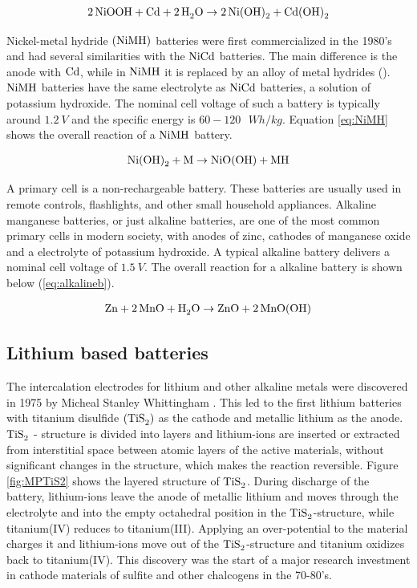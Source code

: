 \begin{align}\label{eq:NiCdb}
\ce{2NiOOH} + \ce{Cd} + \ce{2H_2O} \rightarrow \ce{2Ni(OH)_2} + \ce{Cd(OH)_2}
\end{align}

Nickel-metal hydride $(\ce{NiMH})$  batteries were first commercialized in the 1980's and had several similarities with the $\ce{NiCd}$ batteries. The main difference is the anode with $\ce{Cd}$, while in $\ce{NiMH}$ it is replaced by an alloy of metal hydrides (). $\ce{NiMH}$ batteries have the same electrolyte as $\ce{NiCd}$ batteries, a solution of potassium hydroxide. The nominal cell voltage of such a battery is typically around $\SI{1.2}{V}$ and the specific energy is $60-120\text{ } \si{Wh/kg}$. Equation \ref{eq:NiMH} shows the overall reaction of a $\ce{NiMH}$ battery.

\begin{align}\label{eq:NiMH}
\ce{Ni(OH)_2} + \ce{M} \rightarrow \ce{NiO(OH)} + \ce{MH}
\end{align}

A primary cell is a non-rechargeable battery. These batteries are usually used in remote controls, flashlights, and other small household appliances. Alkaline manganese batteries, or just alkaline batteries, are one of the most common primary cells in modern society, with anodes of zinc, cathodes of manganese oxide and a electrolyte of potassium hydroxide. A typical alkaline battery delivers a nominal cell voltage of $\SI{1.5}{V}$. The overall reaction for a alkaline battery is shown below (\ref{eq:alkalineb}).

\begin{align}\label{eq:alkalineb}
\ce{Zn} + \ce{2MnO} +\ce{H_2O} \rightarrow \ce{ZnO} + \ce{2MnO(OH)}
\end{align}

\subsection{Lithium based batteries}

The intercalation electrodes for lithium and other alkaline metals were discovered in 1975 by Micheal Stanley Whittingham \cite{whittingham1975lithium}. This led to the first lithium batteries with titanium disulfide $(\ce{TiS_2})$ as the cathode and metallic lithium as the anode. $\ce{TiS_2} $ - structure is divided into layers and lithium-ions are inserted or extracted from interstitial space between atomic layers of the active materials, without significant changes in the structure, which makes the reaction reversible. Figure \ref{fig:MPTiS2} shows the layered structure of $\ce{TiS_2}$. During discharge of the battery, lithium-ions leave the anode of metallic lithium and moves through the electrolyte and into the empty octahedral position in the $\ce{TiS_2}$-structure, while titanium(IV) reduces to titanium(III). Applying an over-potential to the material charges it and lithium-ions move out of the $\ce{TiS_2}$-structure and titanium oxidizes back to titanium(IV). This discovery was the start of a major research investment in cathode materials of sulfite and other chalcogens in the 70-80's. 


